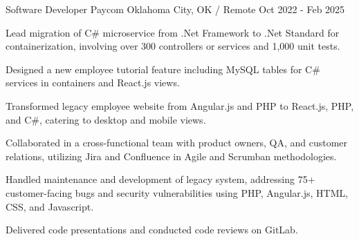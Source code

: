  \cventry
    {Software Developer} %
    {Paycom} %
    {Oklahoma City, OK / Remote} %
    {Oct 2022 - Feb 2025} %
    {
      \begin{cvitems} %
        \item{Lead migration of C\# microservice from .Net Framework to .Net Standard for containerization, involving over 300 controllers or services and 1,000 unit tests.}
        \item{Designed a new employee tutorial feature including MySQL tables for C\# services in containers and React.js views.}
        \item {Transformed legacy employee website from Angular.js and PHP to React.js, PHP, and C\#, catering to desktop and mobile views.}
        \item{Collaborated in a cross-functional team with product owners, QA, and customer relations, utilizing Jira and Confluence in Agile and Scrumban methodologies.}
        \item {Handled maintenance and development of legacy system, addressing 75+ customer-facing bugs and security vulnerabilities using PHP, Angular.js, HTML, CSS, and Javascript.}
        \item {Delivered code presentations and conducted code reviews on GitLab.}
      \end{cvitems}
    }
